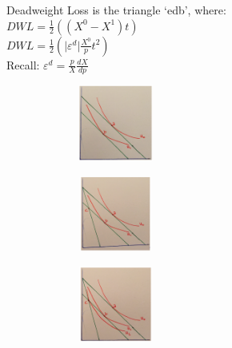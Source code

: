 \documentclass[11pt, english]{article}
\begin{document}
	Deadweight Loss is the triangle `edb', where:\\
	$DWL=\frac{1}{2}((X^0-X^1)t)$\\
	$DWL=\frac{1}{2}\left(\vert\varepsilon^d\vert\frac{X^0}{p}t^2\right)$\\
	Recall: $\varepsilon^d=\frac{p}{X}\frac{dX}{dp}$

	\begin{figure}[H]
        \begin{center}
                \begin{subfigure}[t]{3.5cm}
                \begin{center}
                        \includegraphics[width=3cm,height=2.5cm]{EC315-IMG/36.png}
                \end{center}
                \end{subfigure}
                \begin{subfigure}[t]{3.5cm}
                \begin{center}
                        \includegraphics[width=3cm,height=2.5cm]{EC315-IMG/37.png}
                \end{center}
                \end{subfigure}
                \begin{subfigure}[t]{3.5cm}
                \begin{center}
                        \includegraphics[width=3cm,height=2.5cm]{EC315-IMG/38.png}
                \end{center}
                \end{subfigure}
		\begin{subfigure}[t]{3.5cm}
                \begin{center}

\end{center}
\end{subfigure}
\end{center}
\end{figure}
\end{document}
